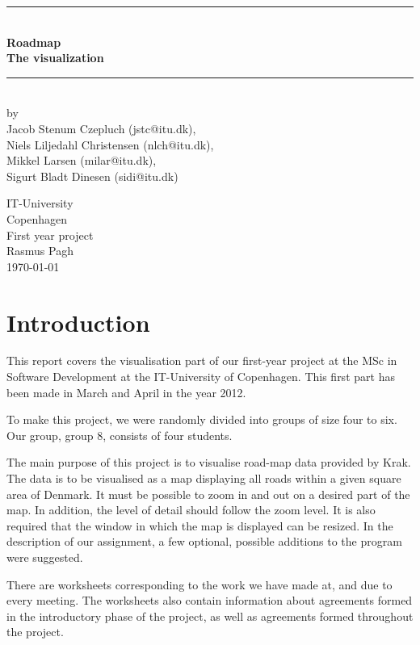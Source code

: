 \documentclass[a4paper,11pt]{article}
\begin{document}
\begin{titlepage}
\centering \parindent=0pt
\newcommand{\HRule}{\rule{\textwidth}{1mm}}
 \HRule\\[1cm]\Huge\bfseries
Roadmap\\[0.7cm]
\large The visualization\\[1cm]
\HRule\\[4cm]  \large by \\Jacob Stenum Czepluch (jstc@itu.dk), \\Niels Liljedahl Christensen (nlch@itu.dk), \\Mikkel Larsen (milar@itu.dk), \\Sigurt Bladt Dinesen (sidi@itu.dk) \\
 \normalsize %
\begin{flushleft}
IT-University\\
Copenhagen\\
First year project\\
Rasmus Pagh\\
\today \end{flushleft}
\end{titlepage}

\tableofcontents
\pagebreak

\pagebreak
\section{Introduction}

This report covers the visualisation part of our first-year project at the MSc in Software Development at the IT-University of Copenhagen. This first part has been made in March and April in the year 2012. 

To make this project, we were randomly divided into groups of size four to six. Our group, group 8, consists of four students. 

The main purpose of this project is to visualise road-map data provided by Krak. The data is to be visualised as a map displaying all roads within a given square area of Denmark.
It must be possible to zoom in and out on a desired part of the map. In addition, the level of detail should follow the zoom level. It is also required that the window in which the map is displayed can be resized. In the description of our assignment, a few  optional, possible additions to the program were suggested. 

There are worksheets corresponding to the work we have made at, and due to every meeting. The worksheets also contain information about agreements formed in the introductory phase of the project, as well as agreements formed throughout the project.
\end{document}
